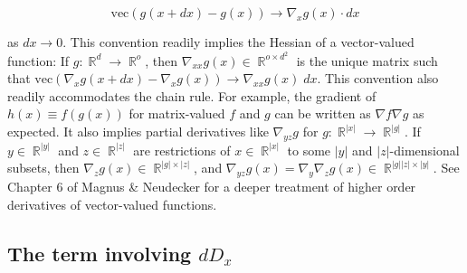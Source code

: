 \documentclass{article}
\newcommand{\R}{\mathop{\mathbb{R}}}
\begin{document}
\begin{equation}
  \mathrm{vec} \left(g(x+dx) - g(x)\right) \to \nabla_x g(x)
  \cdot dx
\end{equation}

as $dx \to 0$. This convention readily implies the Hessian of a vector-valued function: If $g:\R^d \to \R^o$, then
$\nabla_{xx} g(x) \in \R^{o\times d^2}$ is the unique matrix such that $\mathrm{vec} \left(\nabla_x g(x+dx) - \nabla_x
  g(x)\right) \to \nabla_{xx} g(x) \; dx$. This convention also readily accommodates the chain rule. For example, the
gradient of $h(x) \equiv f(g(x))$ for matrix-valued $f$ and $g$ can be written as $\nabla f \nabla g$ as expected. It
also implies partial derivatives like $\nabla_{yz} g$ for $g:\R^{|x|} \to \R^{|g|}$. If $y\in \R^{|y|}$ and $z\in
  \R^{|z|}$ are restrictions of $x \in \R^{|x|}$ to some $|y|$ and $|z|$-dimensional subsets, then $\nabla_z g(x) \in
  \R^{|g| \times |z|}$, and $\nabla_{yz} g(x) = \nabla_y \nabla_z g(x) \in \R^{|g||z| \times |y|}$. See Chapter 6 of
Magnus \& Neudecker \cite{magnus-neudecker} for a deeper treatment of higher order derivatives of vector-valued
functions.

\subsection{The term involving $dD_x$}
\end{document}
